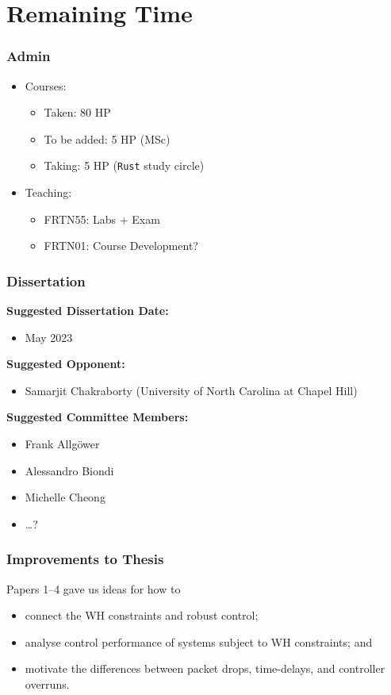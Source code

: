 \section{Remaining Time}%

\begin{frame}
    \frametitle{Admin}
    \begin{itemize}
        \item Courses: 
            \begin{itemize}
                \item Taken: 80 HP
                \item To be added: 5 HP (MSc)
                \item Taking: 5 HP (\texttt{Rust} study circle)
            \end{itemize} 
        \item Teaching: 
            \begin{itemize}
                \item FRTN55: Labs + Exam
                \item FRTN01: Course Development?
            \end{itemize}
    \end{itemize}
\end{frame}

\begin{frame}
    \frametitle{Dissertation}
    \textbf{Suggested Dissertation Date:}
    \begin{itemize}
        \item May 2023
    \end{itemize}

    \textbf{Suggested Opponent:}
    \begin{itemize}
        \item Samarjit Chakraborty (University of North Carolina at Chapel Hill)
    \end{itemize}

    \textbf{Suggested Committee Members:} 
    \begin{itemize}
        \item Frank Allg{\"o}wer
        \item Alessandro Biondi
        \item Michelle Cheong
        \item \dots ?
    \end{itemize}
\end{frame}

\begin{frame}
    \frametitle{Improvements to Thesis}
    Papers 1--4 gave us ideas for how to
    \begin{itemize}
        \item connect the WH constraints and robust control;
        \item analyse control performance of systems subject to WH constraints; and
        \item motivate the differences between packet drops, time-delays, and controller overruns. 
    \end{itemize}
\end{frame}


